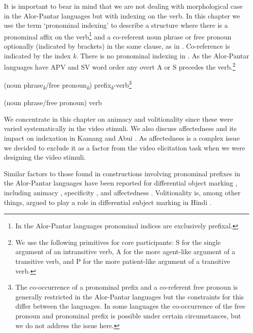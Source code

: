 It is important to bear in mind that we are not dealing with morphological case in the Alor-Pantar languages but with indexing on the verb. In this chapter we use the term `pronominal indexing'  to describe a structure where there is a pronominal affix on the verb\footnote{In the Alor-Pantar languages pronominal indices are exclusively prefixal.} and a co-referent noun phrase or free pronoun  optionally (indicated by brackets) in the same clause, as in . Co-reference is indicated by the index \textit{k}. There is no pronominal indexing in . As the Alor-Pantar languages have APV and SV word order any overt A or S precedes the verb.\footnote{We use the following primitives for core participants: S for the single argument of an intransitive verb, A for the more agent-like argument of a transitive verb, and P for the more patient-like argument of a transitive verb.} 

\ea%
\label{bkm:Ref306281876} 
    (noun phrase\textit{\textsubscript{k}}/free pronoun\textit{\textsubscript{k}})    prefix\textit{\textsubscript{k}}{}-verb\footnote{The co-occurrence of a pronominal prefix and a co-referent free pronoun is generally restricted in the Alor-Pantar languages but the constraints for this differ between the languages. In some languages the co-occurrence of the free pronoun and pronominal prefix is possible under certain circumstances, but we do not address the issue here.}
\z


\ea%
\label{bkm:Ref306281880}
(noun phrase/free pronoun)    verb 
\z

    

We concentrate in this chapter on animacy  and volitionality  since these were varied systematically in the video stimuli. We also discuss affectedness  and its impact on indexation in Kamang  and Abui . As affectedness is a complex issue \citep{Tsunoda1985,Beavers2011} we decided to exclude it as a factor from the video elicitation task when we were designing the video stimuli. 

Similar factors to those found in constructions involving pronominal prefixes  in the Alor-Pantar languages have been reported for differential object marking , including animacy  \citep{Bossong1991,Croft1988,Aissen2003}, specificity  \citep{VonHeusingerEtAl2005}, and affectedness  \citep{HopperEtAl1980,Tsunoda1981,Tsunoda1985,VonHeusingerEtAl2011}. Volitionality  is, among other things, argued to play a role in differential subject marking  in Hindi  \citep{Mohanan1990}.

